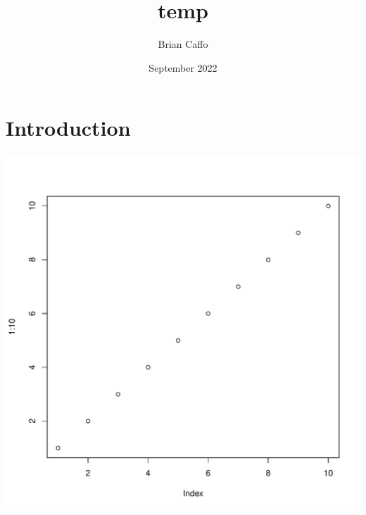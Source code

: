 \documentclass{article}
\title{temp}
\author{Brian Caffo}
\date{September 2022}
\begin{document}
\maketitle

\section{Introduction}

\includegraphics{rplots.pdf}
\end{document}
